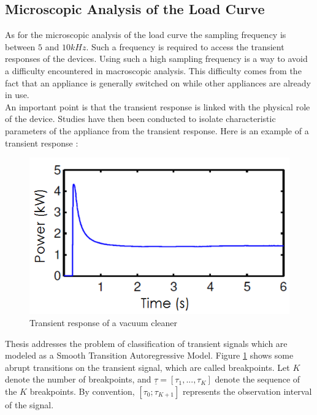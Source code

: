 
\subsection{Microscopic Analysis of the Load Curve}
As for the microscopic analysis of the load curve the sampling frequency is between $5$ and $10kHz$. Such a frequency is required to access the transient responses of the devices. Using such a high sampling frequency is a way to avoid a difficulty encountered in macroscopic analysis. This difficulty comes from the fact that an appliance is generally switched on while other appliances are already in use.
\\

An important point is that the transient response is linked with the physical role of the device. Studies have then been conducted to isolate characteristic parameters of the appliance from the transient response. Here is an example of a transient response :
\\

\begin{figure}[H]
\centering
\includegraphics[scale=0.5]{figures/transient_response.png}
\caption{Transient response of a vacuum cleaner}
\label{fig:transient_response}
\end{figure}


Thesis \cite{research2} addresses the problem of classification of transient signals which are modeled as a Smooth Transition Autoregressive Model. Figure \ref{fig:transient_response} shows some abrupt transitions on the transient signal, which are called breakpoints. Let $K$ denote the number of breakpoints, and $\underline{\tau} = [\tau_1,...,\tau_K]$ denote the sequence of the $K$ breakpoints. By convention, $[\tau_0;\tau_{K+1}]$ represents the observation interval of the signal.
\\

